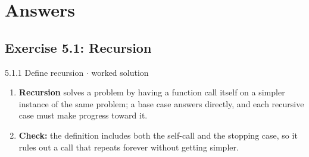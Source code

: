 \documentclass[11pt]{article}
\begin{document}
\section{Answers}
\begin{keepsection}\subsection{Exercise 5.1: Recursion}

\begin{workedbox}{5.1.1 Define recursion \ensuremath{\cdot} worked solution}
\begin{enumerate}
\item \textbf{Recursion} solves a problem by having a function call itself on a simpler instance of the same problem; a base case answers directly, and each recursive case must make progress toward it.
\item \textbf{Check:} the definition includes both the self-call and the stopping case, so it rules out a call that repeats forever without getting simpler.
\end{enumerate}
\end{workedbox}

\end{keepsection}
\end{document}
